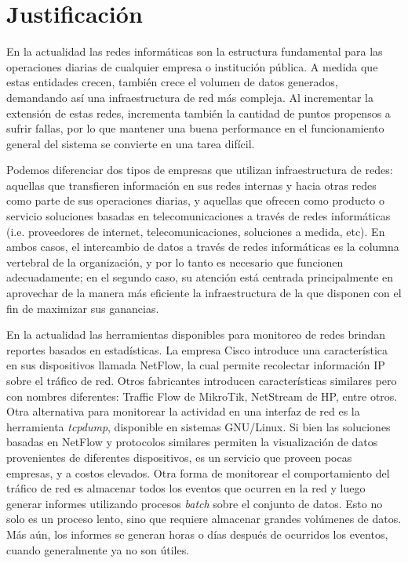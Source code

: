 \section*{Justificación}
En la actualidad las redes informáticas son la estructura fundamental para las operaciones diarias de cualquier empresa o institución pública. A medida que estas entidades crecen, también crece el volumen de datos generados, demandando así una infraestructura de red más compleja. Al incrementar la extensión de estas redes, incrementa también la cantidad de puntos propensos a sufrir fallas, por lo que mantener una buena performance en el funcionamiento general del sistema se convierte en una tarea difícil. 

Podemos diferenciar dos tipos de empresas que utilizan infraestructura de redes: aquellas que transfieren información en sus redes internas y hacia otras redes como parte de sus operaciones diarias, y aquellas que ofrecen como producto o servicio soluciones basadas en telecomunicaciones a través de redes informáticas (i.e. proveedores de internet, telecomunicaciones, soluciones a medida, etc). En ambos casos, el intercambio de datos a través de redes informáticas es la columna vertebral de la organización, y por lo tanto es necesario que funcionen adecuadamente; en el segundo caso, su atención está centrada principalmente en aprovechar de la manera más eficiente la infraestructura de la que disponen con el fin de maximizar sus ganancias.

En la actualidad las herramientas disponibles para monitoreo de redes brindan reportes basados en estadísticas. La empresa Cisco introduce una característica en sus dispositivos llamada NetFlow, la cual permite recolectar información IP sobre el tráfico de red. Otros fabricantes introducen características similares pero con nombres diferentes: Traffic Flow de MikroTik, NetStream de HP, entre otros. Otra alternativa para monitorear la actividad en una interfaz de red es la herramienta \textit{tcpdump}, disponible en sistemas GNU/Linux. Si bien las soluciones basadas en NetFlow y protocolos similares permiten la visualización de datos provenientes de diferentes dispositivos, es un servicio que proveen pocas empresas, y a costos elevados. Otra forma de monitorear el comportamiento del tráfico de red es almacenar todos los eventos que ocurren en la red y luego generar informes utilizando procesos \textit{batch} sobre el conjunto de datos. Esto no solo es un proceso lento, sino que requiere almacenar grandes volúmenes de datos. Más aún, los informes se generan horas o días después de ocurridos los eventos, cuando generalmente ya no son útiles.

